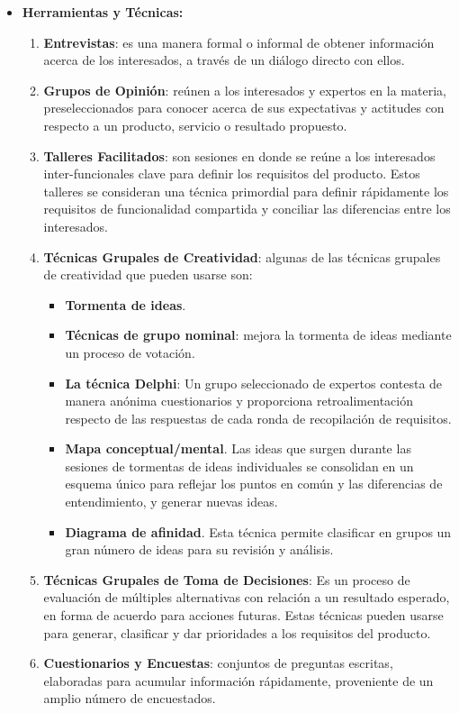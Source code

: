 \documentclass[10pt,a4paper]{article}
\begin{document}
\begin{itemize}
\item \textbf{Herramientas y Técnicas:}
\begin{enumerate}
\item \textbf{Entrevistas}: es una manera formal o informal de obtener información acerca de los interesados, a través de un diálogo directo con ellos.
\item \textbf{Grupos de Opinión}: reúnen a los interesados y expertos en la materia, preseleccionados para conocer acerca de sus expectativas y actitudes con respecto a un producto, servicio o resultado propuesto.
\item \textbf{Talleres Facilitados}: son sesiones en donde se reúne a los interesados inter-funcionales clave para definir los requisitos del producto. Estos talleres se consideran una técnica primordial para definir rápidamente los requisitos de funcionalidad compartida y conciliar las diferencias entre los interesados.
\item \textbf{Técnicas Grupales de Creatividad}: algunas de las técnicas grupales de creatividad que pueden usarse son:
\begin{itemize}
\item \textbf{Tormenta de ideas}.
\item \textbf{Técnicas de grupo nominal}: mejora la tormenta de ideas mediante un proceso de votación.
\item \textbf{La técnica Delphi}: Un grupo seleccionado de expertos contesta de manera anónima cuestionarios y proporciona retroalimentación respecto de las respuestas de cada ronda de recopilación de requisitos.
\item \textbf{Mapa conceptual/mental}. Las ideas que surgen durante las sesiones de tormentas de ideas individuales se consolidan en un esquema único para reflejar los puntos en común y las diferencias de entendimiento, y generar nuevas ideas.
\item \textbf{Diagrama de afinidad}. Esta técnica permite clasificar en grupos un gran número de ideas para su revisión y análisis.
\end{itemize}
\item \textbf{Técnicas Grupales de Toma de Decisiones}: Es un proceso de evaluación de múltiples alternativas con relación a un resultado esperado, en forma de acuerdo para acciones futuras. Estas técnicas pueden usarse para generar, clasificar y dar prioridades a los requisitos del producto.
\item \textbf{Cuestionarios y Encuestas}: conjuntos de preguntas escritas, elaboradas para acumular información rápidamente, proveniente de un amplio número de encuestados.

\end{enumerate}
\end{itemize}
\end{document}
